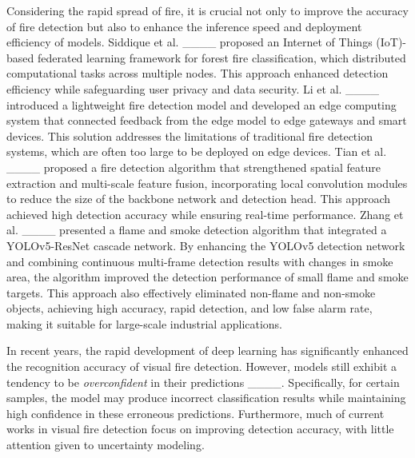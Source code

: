Considering the rapid spread of fire, it is crucial not only to improve the accuracy of fire detection but also to enhance the inference speed and deployment efficiency of models. Siddique et al. ____ proposed an Internet of Things (IoT)-based federated learning framework for forest fire classification, which distributed computational tasks across multiple nodes. This approach enhanced detection efficiency while safeguarding user privacy and data security. Li et al. ____ introduced a lightweight fire detection model and developed an edge computing system that connected feedback from the edge model to edge gateways and smart devices. This solution addresses the limitations of traditional fire detection systems, which are often too large to be deployed on edge devices. Tian et al. ____ proposed a fire detection algorithm that strengthened spatial feature extraction and multi-scale feature fusion, incorporating local convolution modules to reduce the size of the backbone network and detection head. This approach achieved high detection accuracy while ensuring real-time performance. Zhang et al. ____ presented a flame and smoke detection algorithm that integrated a YOLOv5-ResNet cascade network. By enhancing the YOLOv5 detection network and combining continuous multi-frame detection results with changes in smoke area, the algorithm improved the detection performance of small flame and smoke targets. This approach also effectively eliminated non-flame and non-smoke objects, achieving high accuracy, rapid detection, and low false alarm rate, making it suitable for large-scale industrial applications.

In recent years, the rapid development of deep learning has significantly enhanced the recognition accuracy of visual fire detection. However, models still exhibit a tendency to be \textit{overconfident} in their predictions ____. Specifically, for certain samples, the model may produce incorrect classification results while maintaining high confidence in these erroneous predictions. Furthermore, much of current works in visual fire detection focus on improving detection accuracy, with little attention given to uncertainty modeling.

